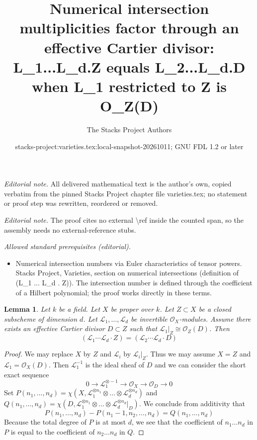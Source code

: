 \documentclass[10pt,a4paper]{amsart}
\title{Numerical intersection multiplicities factor through an effective Cartier divisor: L\_1...L\_d.Z equals L\_2...L\_d.D when L\_1 restricted to Z is O\_Z(D)}
\author{The Stacks Project Authors}
\date{stacks-project:varieties.tex:local-snapshot-20261011; GNU FDL 1.2 or later}
\theoremstyle{plain}
\newtheorem{lemma}[subsection]{Lemma}
\theoremstyle{definition}
\theoremstyle{remark}
\numberwithin{equation}{subsection}
\begin{document}
\maketitle
\noindent\textit{Editorial note.} All delivered mathematical text is the author's own, copied verbatim from the pinned Stacks Project chapter file varieties.tex; no statement or proof step was rewritten, reordered or removed.\par\medskip
\noindent\textit{Editorial note.} The proof cites no external \textbackslash{}ref inside the counted span, so the assembly needs no external-reference stubs.\par\medskip
\noindent\textit{Allowed standard prerequisites (editorial).}\begin{itemize}
\item Numerical intersection numbers via Euler characteristics of tensor powers. Stacks Project, Varieties, section on numerical intersections (definition of (L\_1 ... L\_d . Z)). The intersection number is defined through the coefficient of a Hilbert polynomial; the proof works directly in these terms.
\end{itemize}\medskip
\begin{lemma}
\label{lemma-numerical-intersection-effective-Cartier-divisor}
Let $k$ be a field. Let $X$ be proper over $k$. Let $Z \subset X$ be
a closed subscheme of dimension $d$. Let $\mathcal{L}_1, \ldots, \mathcal{L}_d$
be invertible $\mathcal{O}_X$-modules. Assume there exists an
effective Cartier divisor $D \subset Z$ such that
$\mathcal{L}_1|_Z \cong \mathcal{O}_Z(D)$. Then
$$
(\mathcal{L}_1 \cdots \mathcal{L}_d \cdot Z) =
(\mathcal{L}_2 \cdots \mathcal{L}_d \cdot D)
$$
\end{lemma}

\begin{proof}
We may replace $X$ by $Z$ and $\mathcal{L}_i$ by $\mathcal{L}_i|_Z$.
Thus we may assume $X = Z$ and $\mathcal{L}_1 = \mathcal{O}_X(D)$.
Then $\mathcal{L}_1^{-1}$ is the ideal sheaf of $D$ and we can
consider the short exact sequence
$$
0 \to \mathcal{L}_1^{\otimes -1} \to \mathcal{O}_X \to \mathcal{O}_D \to 0
$$
Set
$P(n_1, \ldots, n_d) =
\chi(X, \mathcal{L}_1^{\otimes n_1} \otimes \ldots \otimes
\mathcal{L}_d^{\otimes n_d})$
and
$Q(n_1, \ldots, n_d) =
\chi(D, \mathcal{L}_1^{\otimes n_1} \otimes \ldots \otimes
\mathcal{L}_d^{\otimes n_d}|_D)$.
We conclude from additivity that
$$
P(n_1, \ldots, n_d) - P(n_1 - 1, n_2, \ldots, n_d) =
Q(n_1, \ldots, n_d)
$$
Because the total degree of $P$ is at most $d$, we see that
the coefficient of $n_1 \ldots n_d$ in $P$ is equal to the coefficient
of $n_2 \ldots n_d$ in $Q$.
\end{proof}
\end{document}
